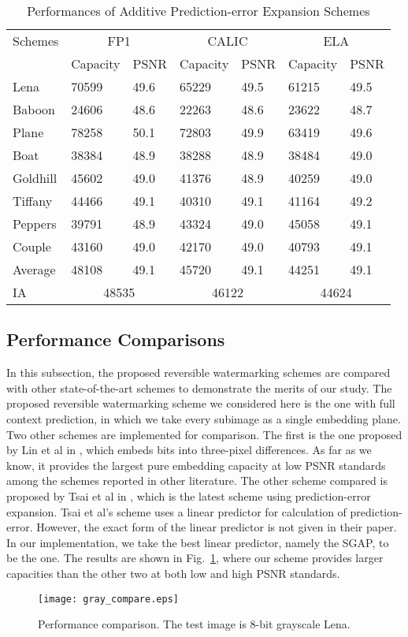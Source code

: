 \documentclass[journal]{IEEEtran}
\begin{document}
\begin{table}[t]
    \centering
    \caption{\label{tbl:iaresults}Performances of Additive Prediction-error Expansion Schemes}
    \begin{tabular}{lllllll}\hline\hline
      Schemes & \multicolumn{2}{c}{FP1} & \multicolumn{2}{c}{CALIC} & \multicolumn{2}{c}{ELA} \\
	 & Capacity & PSNR & Capacity & PSNR & Capacity & PSNR \\\hline
	Lena	& 70599 & 49.6 & 65229 & 49.5 & 61215 & 49.5 \\
	Baboon	& 24606 & 48.6 & 22263 & 48.6 & 23622 & 48.7 \\
	Plane	& 78258 & 50.1 & 72803 & 49.9 & 63419 & 49.6 \\
	Boat	& 38384 & 48.9 & 38288 & 48.9 & 38484 & 49.0 \\
	Goldhill& 45602 & 49.0 & 41376 & 48.9 & 40259 & 49.0 \\
	Tiffany	& 44466 & 49.1 & 40310 & 49.1 & 41164 & 49.2 \\
	Peppers	& 39791 & 48.9 & 43324 & 49.0 & 45058 & 49.1 \\
	Couple	& 43160 & 49.0 & 42170 & 49.0 & 40793 & 49.1 \\
	Average	& 48108 & 49.1 & 45720 & 49.1 & 44251 & 49.1 \\
	IA & \multicolumn{2}{c}{48535} & \multicolumn{2}{c}{46122} & \multicolumn{2}{c}{44624} \\\hline\hline
    \end{tabular}
\end{table}
\subsection{Performance Comparisons}\label{sub:compare}
In this subsection, the proposed reversible watermarking schemes are compared with other
state-of-the-art schemes to demonstrate the merits of our study. The proposed reversible
watermarking scheme we considered here is the one with full context prediction, in which we take
every subimage as a single embedding plane. Two other schemes are implemented for comparison.
The first is the one proposed by Lin et al in \cite{Lin08tp}, which embeds bits into three-pixel
differences. As far as we know, it provides the largest pure embedding capacity at low PSNR
standards among the schemes reported in other literature. The other scheme compared is proposed by
Tsai et al in \cite{Tsai09pe}, which is the latest scheme using prediction-error expansion. Tsai et
al's scheme uses a linear predictor for calculation of prediction-error. However, the exact form of
the linear predictor is not given in their paper. In our implementation, we take the best linear
predictor, namely the SGAP, to be the one. The results are shown in Fig.\ \ref{fig:comlen}, where
our scheme provides larger capacities than the other two at both low and high PSNR standards. 
\begin{figure}[t]
    \centering
    \texttt{[image: gray\_compare.eps]}
    \caption{\label{fig:comlen}Performance comparison. The test image is 8-bit grayscale Lena. }
\end{figure}
\end{document}
